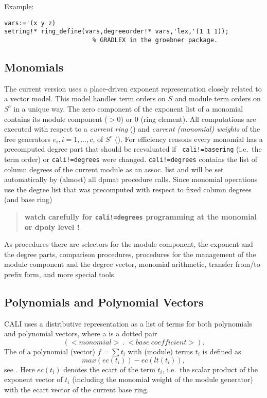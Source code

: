 \noindent Example:
\begin{verbatim}
vars:='(x y z)
setring!* ring_define(vars,degreeorder!* vars,'lex,'(1 1 1));   
                        % GRADLEX in the groebner package.
\end{verbatim}

\subsection{Monomials}

The current version uses a place-driven exponent representation
closely related to a vector model. This model handles term orders  on $S$
and module term orders on $S^c$ in a unique way. The zero component of the
exponent list of a monomial contains its module component ($>0$) or 0
(ring element). All computations are executed with respect to a
{\em current ring} () and {\em current (monomial)
weights} of the free generators $e_i, i=1,\ldots,c$, of $S^c$ 
(). For efficiency reasons every monomial has a
precomputed degree part that should be reevaluated if {\tt
cali!=basering} (i.e.\ the term order) or {\tt cali!=degrees} were
changed. {\tt cali!=degrees} contains the list of column degrees of
the current module as an assoc. list and will be set automatically by
(almost) all dpmat procedure calls. Since monomial operations use the
degree list that was precomputed with respect to fixed column degrees
(and base ring) 
\begin{quote}\bf
watch carefully for {\tt cali!=degrees} programming at the monomial 
or dpoly level !
\end{quote}

As procedures there are selectors for the module component, the exponent and
the degree parts, comparison procedures, procedures for the management of
the module component and the degree vector, monomial arithmetic, transfer 
from/to prefix form, and more special tools.  

\subsection{Polynomials and Polynomial Vectors}

CALI uses a distributive representation as a list of terms for both
polynomials and polynomial vectors, where a  is a dotted
pair
\[(<monomial>\ .\ <base\ coefficient>).\] 
The  of a polynomial (vector) $f=\sum{t_i}$ with (module)
terms $t_i$ is defined as \[max(ec(t_i))-ec(lt(t_i)),\] see
\cite{tcah}. Here $ec(t_i)$ denotes the ecart of the term $t_i$, i.e.\
the scalar product of the exponent vector of $t_i$ (including the
monomial weight of the module generator) with the ecart vector of the
current base ring.

